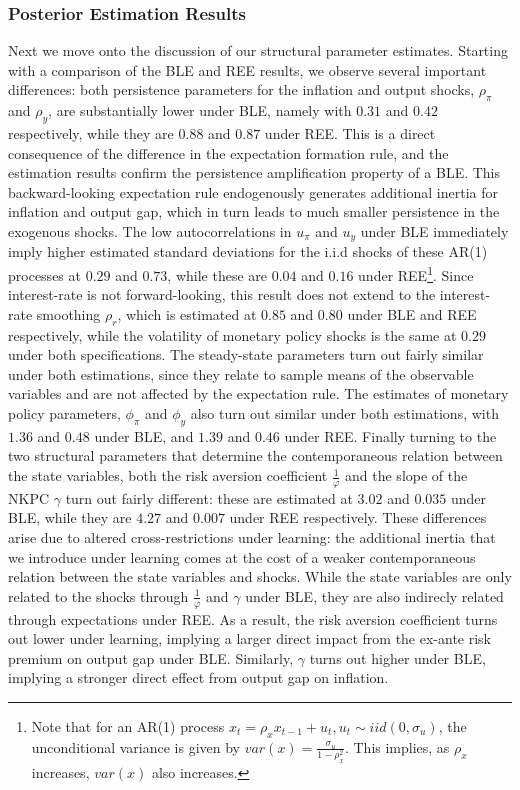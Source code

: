 \subsubsection*{Posterior Estimation Results}
\noindent
Next we move onto the discussion of our structural parameter estimates. Starting with a comparison of the BLE and REE results, we observe several important differences: both persistence parameters for the inflation and output shocks, $\rho_{\pi} $ and $\rho_y$, are substantially lower under BLE, namely with $0.31$ and $0.42$ respectively, while they are $0.88$ and $0.87$ under REE. This is a direct consequence of the difference in the expectation formation rule, and the estimation results confirm the persistence amplification property of a BLE. This backward-looking expectation rule endogenously generates additional inertia for inflation and output gap, which in turn leads to much smaller persistence in the exogenous shocks. The low autocorrelations in $u_{\pi}$ and $u_y$ under BLE immediately imply higher estimated standard deviations for the i.i.d shocks of these AR(1) processes at $0.29$ and $0.73$, while these are $0.04$ and $0.16$ under REE\footnote{ Note that for an AR(1) process $ x_t = \rho_x x_{t-1} + u_t,u_t\sim iid(0,\sigma_u)$, the unconditional variance is given by $var(x)=\frac{\sigma_u}{1-\rho_x^2}$. This implies, as $ \rho_x$ increases, $var(x)$ also increases.}. Since interest-rate is not forward-looking, this result does not extend to the interest-rate smoothing $\rho_r$, which is estimated at $0.85$ and $0.80$ under BLE and REE respectively, while the volatility of monetary policy shocks is the same at $0.29$ under both specifications. The steady-state parameters turn out fairly similar under both estimations, since they relate to sample means of the observable variables and are not affected by the expectation rule. The estimates of monetary policy parameters, $\phi_{\pi}$ and $\phi_y$ also turn out similar under both estimations, with $1.36$ and $0.48$ under BLE, and $1.39$ and $0.46$ under REE. Finally turning to the two structural parameters that determine the contemporaneous relation between the state variables, both the risk aversion coefficient $\frac{1}{\varphi}$ and the slope of the NKPC $\gamma$ turn out fairly different: these are estimated at $3.02$ and $0.035$ under BLE, while they are $4.27$ and $0.007$ under REE respectively. These differences arise due to altered cross-restrictions under learning:  the additional inertia that we introduce under learning comes at the cost of a weaker contemporaneous relation between the state variables and shocks. While the state variables are only related to the shocks through $\frac{1}{\varphi}$ and $\gamma$ under BLE, they are also indirecly related through expectations under REE. As a result, the risk aversion coefficient turns out lower under learning, implying a larger direct impact from the ex-ante risk premium on output gap under BLE. Similarly, $\gamma$ turns out higher under BLE, implying a stronger direct effect from output gap on inflation. %
